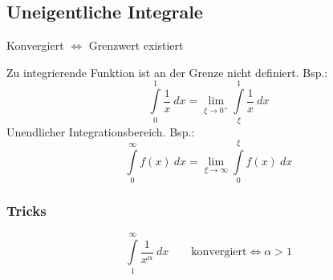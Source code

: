 \subsection{Uneigentliche Integrale}
    \begin{center}
        Konvergiert $\Longleftrightarrow$ Grenzwert existiert
    \end{center}
    
            Zu integrierende Funktion ist an der Grenze nicht definiert. Bsp.:
            $$
                \int\limits_{0}^{1}  \frac{1}{x} \ dx = \lim_{\xi \to 0^+} \int\limits_{\xi}^{1} \frac{1}{x} \ dx
            $$
        Unendlicher Integrationsbereich. Bsp.:
        $$
            \int\limits_{0}^{\infty}  f(x) \ dx = \lim_{\xi \to \infty}\int\limits_{0}^{\xi} f(x) \ dx
        $$
    \subsubsection{Tricks}
        \vspace{-0.5em}
        $$
            \int\limits_{1}^{\infty}  \frac{1}{x^\alpha} \ dx  \qquad \text{konvergiert} \iff \alpha > 1       
        $$